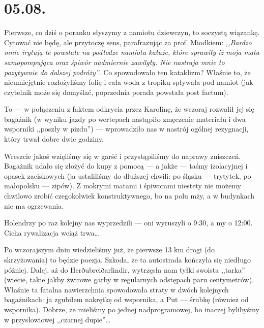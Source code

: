\chapter*{05.08.}

Pierwsze, co dziś o poranku słyszymy z namiotu dziewczyn, to soczystą wiązankę. Cytować nie będę, ale przytoczę sens, parafrazując za prof. Miodkiem: \emph{,,Bardzo mnie irytują te powstałe na podłodze namiotu kałuże, które sprawiły iż moja mata samopompująca oraz śpiwór nadmiernie zawilgły. Nie nastraja mnie to pozytywnie do dalszej podróży''}. Co spowodowało ten kataklizm? Właśnie to, że nieumiejętnie rozłożyliśmy folię i cała woda z tropiku spływała pod namiot (jak czytelnik może się domyślać, poprzednia porada powstała post factum).

To --- w połączeniu z faktem odkrycia przez Karolinę, że wczoraj rozwalił jej się bagażnik (w wyniku jazdy po wertepach nastąpiło zmęczenie materiału i dwa wsporniki ,,poszły w pizdu'') --- wprowadziło nas w nastrój ogólnej rezygnacji, który trwał dobre dwie godziny.

Wreszcie jakoś wzięliśmy się w garść i przystąpiliśmy do naprawy zniszczeń. Bagażnik udało się złożyć do kupy z pomocą --- a jakże --- taśmy izolacyjnej i opasek zaciskowych (ja ustaliliśmy do dłuższej chwili: po śląsku --- trytytek, po małopolsku --- zipów). Z mokrymi matami i śpiworami niestety nie możemy chwilowo zrobić czegokolwiek konstruktywnego, bo na polu mży, a w budynkach nie ma ogrzewania.

Holendrzy po raz kolejny nas wyprzedzili --- oni wyruszyli o 9:30, a my o 12:00. Cicha rywalizacja wciąż trwa…

Po wczorajszym dniu wiedzieliśmy już, że pierwsze 13 km drogi (do skrzyżowania) to będzie poezja. Szkoda, że ta autostrada kończyła się niedługo później. Dalej, aż do Herðubreiðarlindir, wytrzęsła nam tyłki swoista ,,tarka'' (wiecie, takie jakby żwirowe garby w regularnych odstępach paru centymetrów). Właśnie ta fatalna nawierzchnia spowodowała straty w dwóch kolejnych bagażnikach: ja zgubiłem nakrętkę od wspornika, a Put --- śrubkę (również od wspornika). Dobrze, że mieliśmy po jednej nadprogramowej, bo inaczej bylibyśmy w przysłowiowej ,,czarnej dupie''…



